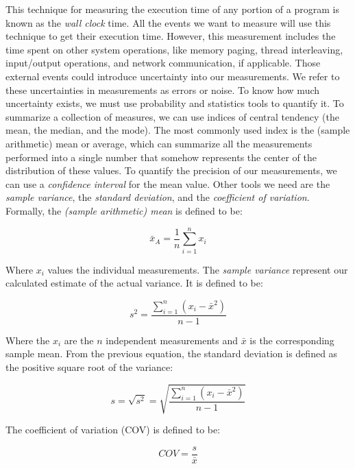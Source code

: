 This technique for measuring the execution time of any portion of a program
is known as the \emph{wall clock} time\cite{lilja2005measuring}. All the events we
want to measure will use this technique to get their execution time.
However, this measurement includes the time spent on other system operations,
like memory paging, thread interleaving, input/output operations, and network
communication, if applicable. Those external events could introduce
uncertainty into our measurements. We refer to these uncertainties in
measurements as errors or noise. To know how much uncertainty exists, we must
use probability and statistics tools to quantify it. To summarize a
collection of measures, we can use indices of central tendency (the mean, the
median, and the mode). The most commonly used index is the (sample
arithmetic) mean or average, which can summarize all the measurements
performed into a single number that somehow represents the center of the
distribution of these values. To quantify the precision of our measurements,
we can use a \emph{confidence interval} for the mean
value\cite{lilja2005measuring, DBLP_conf_oopsla_GeorgesBE07}. Other tools we
need are the \emph{sample variance}, the \emph{standard deviation}, and the \emph{coefficient of
variation}. Formally, the \emph{(sample arithmetic) mean} is defined to be:

\begin{equation}
\bar{x}_A = \frac{1}{n}\sum^n_{i = 1}x_i
\end{equation}

Where \(x_i\) values the individual measurements. The \emph{sample variance}
represent our calculated estimate of the actual variance. It is defined to be:

\begin{equation}
s^2 = \frac{\sum_{i = 1}^n(x_i - \bar{x}^2)}{n - 1}
\end{equation}

Where the \(x_i\) are the \(n\) independent measurements and \(\bar{x}\) is
the corresponding sample mean. From the previous equation, the standard
deviation is defined as the positive square root of the variance:

\begin{equation}
s = \sqrt{s^2} = \sqrt{\frac{\sum_{i = 1}^n(x_i - \bar{x}^2)}{n - 1}}
\end{equation}

The coefficient of variation (COV) is defined to be:

\begin{equation}
  COV = \frac{s}{\bar{x}}
\end{equation}

